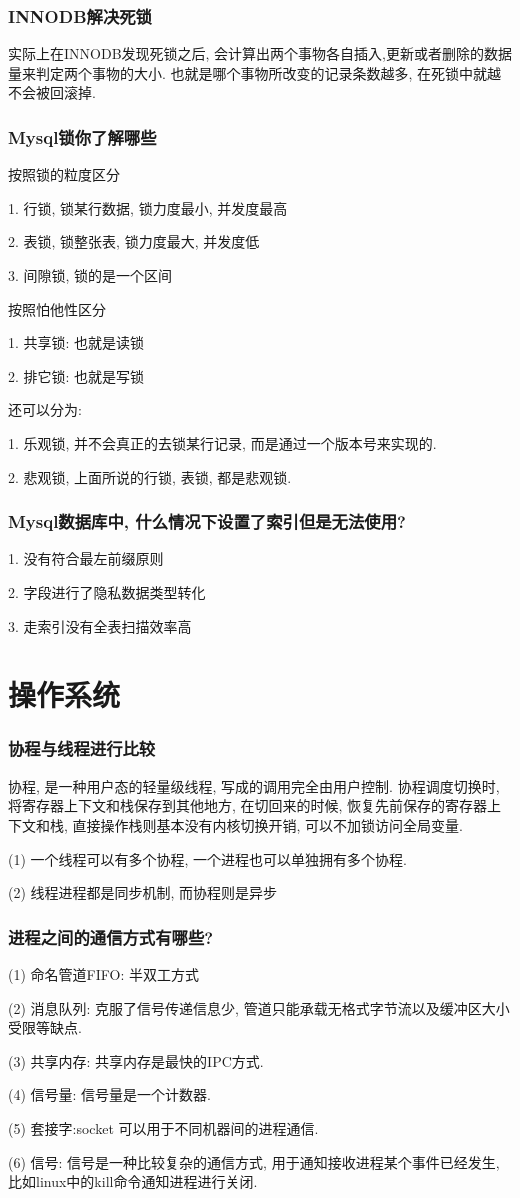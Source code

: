 \documentclass[UTF8]{ctexart}
\begin{document}
\subsubsection{INNODB解决死锁}
实际上在INNODB发现死锁之后, 会计算出两个事物各自插入,更新或者删除的数据量来判定两个事物的大小. 也就是哪个事物所改变的记录条数越多, 在死锁中就越不会被回滚掉.
\subsubsection{Mysql锁你了解哪些}
按照锁的粒度区分 \par
1. 行锁, 锁某行数据, 锁力度最小, 并发度最高 \par
2. 表锁, 锁整张表, 锁力度最大, 并发度低 \par
3. 间隙锁, 锁的是一个区间 \par
按照怕他性区分 \par
1. 共享锁: 也就是读锁 \par
2. 排它锁: 也就是写锁 \par
还可以分为: \par
1. 乐观锁, 并不会真正的去锁某行记录, 而是通过一个版本号来实现的. \par
2. 悲观锁, 上面所说的行锁, 表锁, 都是悲观锁. \par
\subsubsection{Mysql数据库中, 什么情况下设置了索引但是无法使用?}
1. 没有符合最左前缀原则 \par
2. 字段进行了隐私数据类型转化 \par
3. 走索引没有全表扫描效率高
\section{操作系统}
\subsubsection{协程与线程进行比较}
协程, 是一种用户态的轻量级线程, 写成的调用完全由用户控制. 协程调度切换时, 将寄存器上下文和栈保存到其他地方, 在切回来的时候, 恢复先前保存的寄存器上下文和栈, 直接操作栈则基本没有内核切换开销, 可以不加锁访问全局变量. \par
(1) 一个线程可以有多个协程, 一个进程也可以单独拥有多个协程. \par
(2) 线程进程都是同步机制, 而协程则是异步 \par
\subsubsection{进程之间的通信方式有哪些?}
(1) 命名管道FIFO: 半双工方式 \par
(2) 消息队列: 克服了信号传递信息少, 管道只能承载无格式字节流以及缓冲区大小受限等缺点. \par
(3) 共享内存: 共享内存是最快的IPC方式. \par
(4) 信号量: 信号量是一个计数器. \par
(5) 套接字:socket 可以用于不同机器间的进程通信. \par
(6) 信号: 信号是一种比较复杂的通信方式, 用于通知接收进程某个事件已经发生, 比如linux中的kill命令通知进程进行关闭. \par
\end{document}
